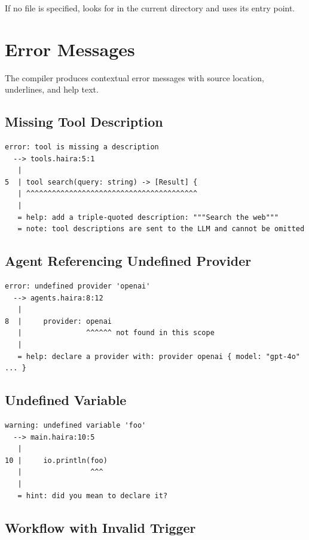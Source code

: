 If no file is specified,  looks for  in the current directory and uses its entry point.

\section{Error Messages}

The compiler produces contextual error messages with source location, underlines, and help text.

\subsection{Missing Tool Description}

\begin{lstlisting}[language={},numbers=none]
error: tool is missing a description
  --> tools.haira:5:1
   |
5  | tool search(query: string) -> [Result] {
   | ^^^^^^^^^^^^^^^^^^^^^^^^^^^^^^^^^^^^^^^^
   |
   = help: add a triple-quoted description: """Search the web"""
   = note: tool descriptions are sent to the LLM and cannot be omitted
\end{lstlisting}

\subsection{Agent Referencing Undefined Provider}

\begin{lstlisting}[language={},numbers=none]
error: undefined provider 'openai'
  --> agents.haira:8:12
   |
8  |     provider: openai
   |               ^^^^^^ not found in this scope
   |
   = help: declare a provider with: provider openai { model: "gpt-4o" ... }
\end{lstlisting}

\subsection{Undefined Variable}

\begin{lstlisting}[language={},numbers=none]
warning: undefined variable 'foo'
  --> main.haira:10:5
   |
10 |     io.println(foo)
   |                ^^^
   |
   = hint: did you mean to declare it?
\end{lstlisting}

\subsection{Workflow with Invalid Trigger}

